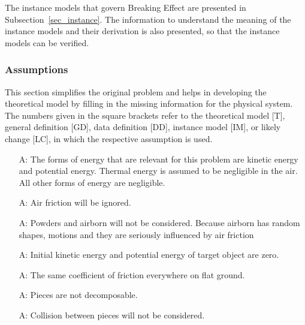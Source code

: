 \documentclass[12pt]{article}
\newcounter{assumpnum} %
\newcommand{\progname}{Breaking Effect} %
\begin{document}
	The instance models that govern \progname{} are presented in
	Subsection~\ref{sec_instance}.  The information to understand the meaning of the
	instance models and their derivation is also presented, so that the instance
	models can be verified.
	
	\subsubsection{Assumptions}
	
	This section simplifies the original problem and helps in developing the
	theoretical model by filling in the missing information for the physical
	system. The numbers given in the square brackets refer to the theoretical model
	[T], general definition [GD], data definition [DD], instance model [IM], or
	likely change [LC], in which the respective assumption is used.
	
	\begin{itemize}
		
		\item[A\refstepcounter{assumpnum}\theassumpnum \label{A_mechanical}:]
		The forms of energy that are relevant for this problem are kinetic energy and
		potential energy. Thermal energy is assumed to be negligible in the air. All
		other forms of energy are negligible. 
		
		\item[A\refstepcounter{assumpnum}\theassumpnum \label{A_airFriction}:]
		Air friction will be ignored.
		
		\item[A\refstepcounter{assumpnum}\theassumpnum \label{A_powder}:]
		Powders and airborn  will not be considered. Because airborn
		has random shapes, motions and they are seriously influenced by air friction
		 
		
		\item[A\refstepcounter{assumpnum}\theassumpnum \label{A_initialPE}:]
		Initial kinetic energy and potential energy of target object are zero. 
		
		\item[A\refstepcounter{assumpnum}\theassumpnum \label{A_ground}:]
		The same coefficient of friction everywhere on flat ground.​
		
		\item[A\refstepcounter{assumpnum}\theassumpnum \label{A_piece}:]
		Pieces are not decomposable. 
		
		\item[A\refstepcounter{assumpnum}\theassumpnum \label{A_collision}:]
		Collision between pieces will not be considered. 
		
	\end{itemize}
	
\end{document}
